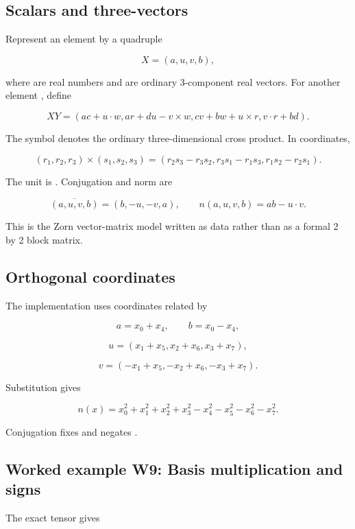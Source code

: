 \documentclass[11pt]{article}
\begin{document}
\subsection{Scalars and three-vectors}

Represent an element by a quadruple

\[
X=(a,u,v,b),
\]

where \texttt{} are real numbers and \texttt{} are ordinary 3-component real vectors. For another element \texttt{}, define

\[
XY=\left(
ac+u\mathbin{\cdot}w,
ar+du-v\mathbin{\times}w,
cv+bw+u\mathbin{\times}r,
v\mathbin{\cdot}r+bd
\right).
\]

The symbol \texttt{} denotes the ordinary three-dimensional cross product. In coordinates,

\[
(r_1,r_2,r_3)\mathbin{\times}(s_1,s_2,s_3)
=(r_2s_3-r_3s_2,
 r_3s_1-r_1s_3,
 r_1s_2-r_2s_1).
\]

The unit is \texttt{}. Conjugation and norm are

\[
\overline{(a,u,v,b)}=(b,-u,-v,a),
\qquad
n(a,u,v,b)=ab-u\mathbin{\cdot}v.
\]

This is the Zorn vector-matrix model written as data rather than as a formal 2 by 2 block matrix.

\subsection{Orthogonal coordinates}

The implementation uses coordinates \texttt{} related by

\[
a=x_0+x_4,\qquad b=x_0-x_4,
\]

\[
u=(x_1+x_5,x_2+x_6,x_3+x_7),
\]

\[
v=(-x_1+x_5,-x_2+x_6,-x_3+x_7).
\]

Substitution gives

\[
n(x)=x_0^2+x_1^2+x_2^2+x_3^2
-x_4^2-x_5^2-x_6^2-x_7^2.
\]

Conjugation fixes \texttt{} and negates \texttt{}.

\subsection{Worked example W9: Basis multiplication and signs}

The exact tensor gives
\end{document}
